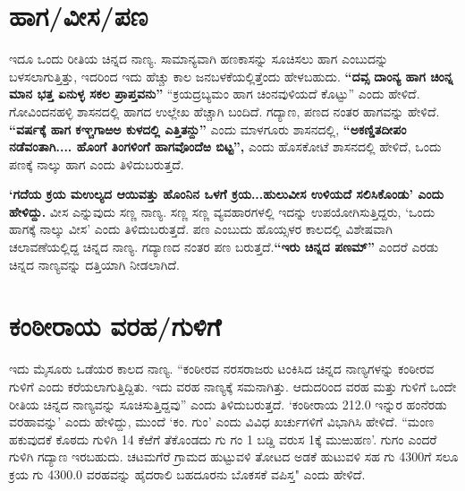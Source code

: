 \section{ಹಾಗ/ವೀಸ/ಪಣ}

ಇದೂ ಒಂದು ರೀತಿಯ ಚಿನ್ನದ ನಾಣ್ಯ. ಸಾಮಾನ್ಯವಾಗಿ ಹಣಕಾಸನ್ನು ಸೂಚಿಸಲು ಹಾಗ ಎಂಬುದನ್ನು ಬಳಸಲಾಗುತ್ತಿತ್ತು, ಇದರಿಂದ ಇದು ಹೆಚ್ಚು ಕಾಲ ಜನಬಳಕೆಯಲ್ಲಿತ್ತೆಂದು ಹೇಳಬಹುದು. \textbf{“ದವ್ಸ ದಾಂನ್ಯ ಹಾಗ ಚಿಂನ್ನ ಮಾನ ಭತ್ತ ಏನುಳ್ಳ ಸಕಲ ಪ್ರಾಪ್ತವನು”} “ಕ್ರಯದ್ರಬ್ಯಮಂ ಹಾಗ ಚಿಂನವುಳಿಯದೆ ಕೊಟ್ಟು” ಎಂದು ಹೇಳಿದೆ. ಗೋವಿಂದನಹಳ್ಳಿ ಶಾಸನದಲ್ಲಿ ಹಾಗದ ಉಲ್ಲೇಖ ಹೆಚ್ಚಾಗಿ ಬಂದಿದೆ. ಗದ್ಯಾಣ, ಪಣದ ನಂತರ ಹಾಗವನ್ನು ಹೇಳಿದೆ. \textbf{“ವರ್ಷಕ್ಕೆ ಹಾಗ ಕಞ್ಚಗಾಱಅ ಕುಳದಲ್ಲಿ ಎತ್ತಿತನ್ದು”} ಎಂದು ಮಾಳಗೂರು ಶಾಸನದಲ್ಲಿ, \textbf{“ಅಕಣ್ಡಿತದೀಪಂ ನಡೆವಂತಾಗಿ.... ಹೊಂಗೆ ತಿಂಗಳಿಂಗೆ ಹಾಗವೊಂದೆಱ ಬಿಟ್ಟ”, }ಎಂದು ಹೊಸಕೋಟೆ ಶಾಸನದಲ್ಲಿ ಹೇಳಿದೆ, ಒಂದು ಪಣಕ್ಕೆ ನಾಲ್ಕು ಹಾಗ ಎಂದು ತಿಳಿದುಬರುತ್ತದೆ.

\textbf{‘ಗದೆಯ ಕ್ರಯ ಮಉಲ್ಯದ ಆಯಿವತ್ತು ಹೊಂನಿನ ಒಳಗೆ ಕ್ರಯ...ಹುಲುವೀಸ ಉಳಿಯದೆ ಸಲಿಸಿಕೊಂಡು’ ಎಂದು ಹೇಳಿದ್ದು.} ವೀಸ ಎನ್ನುವುದು ಸಣ್ಣ ನಾಣ್ಯ. ಸಣ್ಣ ಸಣ್ಣ ವ್ಯವಹಾರಗಳಲ್ಲಿ ಇದನ್ನು ಉಪಯೋಗಿಸುತ್ತಿದ್ದರು, ‘ಒಂದು ಹಾಗಕ್ಕೆ ನಾಲ್ಕು ವೀಸ’ ಎಂದು ತಿಳಿದುಬರುತ್ತದೆ. ಪಣ ಎಂಬುದು ಹೊಯ್ಸಳರ ಕಾಲದಲ್ಲಿ ವಿಶೇಷವಾಗಿ ಚಲಾವಣೆಯಲ್ಲಿದ್ದ ಚಿನ್ನದ ನಾಣ್ಯ. ಗದ್ಯಾಣದ ನಂತರ ಪಣ ಬರುತ್ತದೆ.\textbf{“ಇರು ಚಿನ್ನದ ಪಣಮ್”} ಎಂದರೆ ಎರಡು ಚಿನ್ನದ ನಾಣ್ಯವನ್ನು ದತ್ತಿಯಾಗಿ ನೀಡಲಾಗಿದೆ.

\section{ಕಂಠೀರಾಯ ವರಹ/ಗುಳಿಗೆ}

ಇದು ಮೈಸೂರು ಒಡೆಯರ ಕಾಲದ ನಾಣ್ಯ. “ಕಂಠೀರವ ನರಸರಾಜರು ಟಂಕಿಸಿದ ಚಿನ್ನದ ನಾಣ್ಯಗಳನ್ನು ಕಂಠೀರವ ಗುಳಿಗೆ ಎಂದು ಕರೆಯಲಾಗುತ್ತಿದ್ದಿತು. ಇದು ವರಹ ನಾಣ್ಯಕ್ಕೆ ಸಮನಾಗಿತ್ತು. ಆದುದರಿಂದ ವರಹ ಮತ್ತು ಗುಳಿಗೆ ಒಂದೇ ರೀತಿಯ ಚಿನ್ನದ ನಾಣ್ಯವನ್ನು ಸೂಚಿಸುತ್ತಿದ್ದವು” ಎಂದು ತಿಳಿದುಬರುತ್ತದೆ. ‘ಕಂಠೀರಾಯ 212.0 ಇನ್ನುರ ಹಂನೆರಡು ವರಹಾವನ್ನು’ ಎಂದು ಹೇಳಿದ್ದು, ಮುಂದೆ ‘ಕಂ. ಗುಂ’ ಎಂದು ವಿವಿಧ ಖರ್ಚುಗಳಿಗೆ ವಿಭಾಗಿಸಿ ಹೇಳಿದೆ. “ಮಂಣ ಹಕುವುದಕೆ ಕೊಠದು ಗುಳಿಗಿ 14 ಕೆಱೆಗೆ ತೆಕೊಂಡದು ಗು ಗಂ 1 ಬಡ್ಡಿ ವರುಸ 1ಕ್ಕೆ ಮುಱುಹಣ’. ಗುಗಂ ಎಂದರೆ ಗುಳಿಗಿ ಗದ್ಯಾಣ ಇರಬಹುದು. ಚಟಮಗೆರೆ ಗ್ರಾಮದ ಹುಟ್ಟುವಳಿ ತೋಟದ ಅಡಕೆ ಹುಟುವಳಿ ಸಹ ಗು 4300ಗೆ ಸಲೂ ಕ್ರಯ ಗು 4300.0 ವರಹವನ್ನು ಹೈದರಾಲಿ ಬಹದೂರನು ಬೊಕಸಕೆ ವಪಿಸ್ತ" ಎಂದು ಹೇಳಿದೆ.

